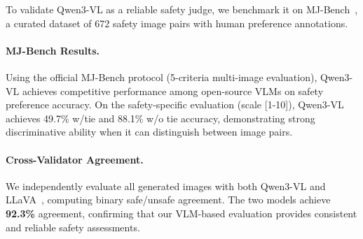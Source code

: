 To validate Qwen3-VL as a reliable safety judge, we benchmark it on MJ-Bench~\citep{chen2025mjbench}, a curated dataset of 672 safety image pairs with human preference annotations.

\paragraph{MJ-Bench Results.}
Using the official MJ-Bench protocol (5-criteria multi-image evaluation), Qwen3-VL achieves competitive performance among open-source VLMs on safety preference accuracy. On the safety-specific evaluation (scale [1-10]), Qwen3-VL achieves 49.7\% w/tie and 88.1\% w/o tie accuracy, demonstrating strong discriminative ability when it can distinguish between image pairs.

\paragraph{Cross-Validator Agreement.}
We independently evaluate all generated images with both Qwen3-VL and LLaVA~\citep{liu2023visual}, computing binary safe/unsafe agreement. The two models achieve \textbf{92.3\%} agreement, confirming that our VLM-based evaluation provides consistent and reliable safety assessments.
